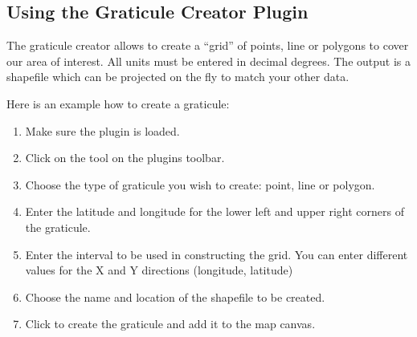 \subsection{Using the Graticule Creator Plugin}

\updatedisclaimer

The graticule creator allows to create a ``grid'' of points, line or polygons to cover our area of interest.
All units must be entered in decimal degrees.
The output is a shapefile which can be projected on the fly to match your other data.


Here is an example how to create a graticule:

\begin{enumerate}
\item Make sure the plugin is loaded.
\item Click on the  tool on the plugins toolbar.
\item Choose the type of graticule you wish to create: point, line or polygon.
\item Enter the latitude and longitude for the lower left and upper right corners of the graticule.
\item Enter the interval to be used in constructing the grid. You can enter different values for the X and Y directions (longitude, latitude)
\item Choose the name and location of the shapefile to be created.
\item Click  to create the graticule and add it to the map canvas.
\end{enumerate} 


